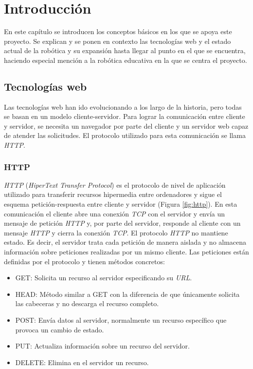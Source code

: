 \chapter{Introducción}
\label{chap:intro} 
En este capítulo se introducen los conceptos básicos en los que se apoya este proyecto. Se explican y se ponen en contexto las tecnologías web y el estado actual de la robótica y su expansión hasta llegar al punto en el que se encuentra, haciendo especial mención a la robótica educativa en la que se centra el proyecto.
   
\section{Tecnologías web}
\label{sec:web}
Las tecnologías web han ido evolucionando a los largo de la historia, pero todas se basan en un modelo cliente-servidor. Para lograr la comunicación entre cliente y servidor, se necesita un navegador por parte del cliente y un servidor web capaz de atender las solicitudes. El protocolo utilizado para esta comunicación se llama \textit{HTTP}.

\subsection{HTTP}
\label{subsec:http}
\textit{HTTP} (\textit{HiperText Transfer Protocol}) es el protocolo de nivel de aplicación utilizado para transferir recursos hipermedia entre ordenadores y sigue el esquema petición-respuesta entre cliente y servidor (Figura \ref{fig:http}). En esta comunicación el cliente abre una conexión \textit{TCP} con el servidor y envía un mensaje de petición \textit{HTTP} y, por parte del servidor, responde al cliente con un mensaje \textit{HTTP} y cierra la conexión \textit{TCP}. 
El protocolo \textit{HTTP} no mantiene estado. Es decir, el servidor trata cada petición de manera aislada y no almacena información sobre peticiones realizadas por un mismo cliente. 
Las peticiones están definidas por el protocolo y tienen métodos concretos: 
\begin{itemize}
    \item GET: Solicita un recurso al servidor especificando su \textit{URL}.
    \item HEAD: Método similar a GET con la diferencia de que únicamente solicita las cabeceras y no descarga el recurso completo.
    \item POST: Envía datos al servidor, normalmente un recurso específico que provoca un cambio de estado. 
    \item PUT: Actualiza información sobre un recurso del servidor. 
    \item DELETE: Elimina en el servidor un recurso.
\end{itemize}

